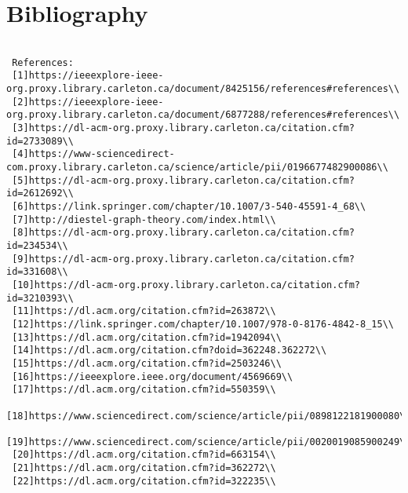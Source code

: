 \documentclass[]{article}
\begin{document}
 \section{Bibliography}
 \begin{verbatim}

 References:
 [1]https://ieeexplore-ieee-org.proxy.library.carleton.ca/document/8425156/references#references\\
 [2]https://ieeexplore-ieee-org.proxy.library.carleton.ca/document/6877288/references#references\\
 [3]https://dl-acm-org.proxy.library.carleton.ca/citation.cfm?id=2733089\\
 [4]https://www-sciencedirect-com.proxy.library.carleton.ca/science/article/pii/0196677482900086\\
 [5]https://dl-acm-org.proxy.library.carleton.ca/citation.cfm?id=2612692\\
 [6]https://link.springer.com/chapter/10.1007/3-540-45591-4_68\\
 [7]http://diestel-graph-theory.com/index.html\\
 [8]https://dl-acm-org.proxy.library.carleton.ca/citation.cfm?id=234534\\
 [9]https://dl-acm-org.proxy.library.carleton.ca/citation.cfm?id=331608\\
 [10]https://dl-acm-org.proxy.library.carleton.ca/citation.cfm?id=3210393\\
 [11]https://dl.acm.org/citation.cfm?id=263872\\
 [12]https://link.springer.com/chapter/10.1007/978-0-8176-4842-8_15\\
 [13]https://dl.acm.org/citation.cfm?id=1942094\\
 [14]https://dl.acm.org/citation.cfm?doid=362248.362272\\
 [15]https://dl.acm.org/citation.cfm?id=2503246\\
 [16]https://ieeexplore.ieee.org/document/4569669\\
 [17]https://dl.acm.org/citation.cfm?id=550359\\
 [18]https://www.sciencedirect.com/science/article/pii/0898122181900080\\
 [19]https://www.sciencedirect.com/science/article/pii/0020019085900249\\
 [20]https://dl.acm.org/citation.cfm?id=663154\\
 [21]https://dl.acm.org/citation.cfm?id=362272\\
 [22]https://dl.acm.org/citation.cfm?id=322235\\

\end{verbatim}
\end{document}

